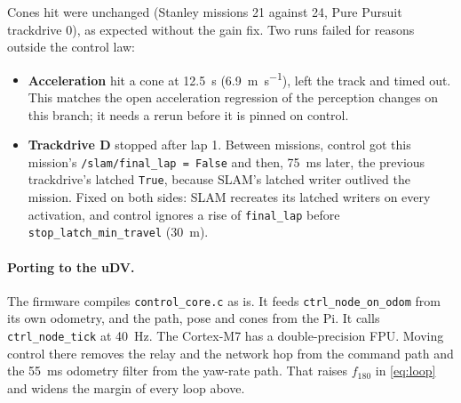 \documentclass[11pt,a4paper]{article}
\begin{document}
Cones hit were unchanged (Stanley missions 21 against 24, Pure Pursuit trackdrive 0), as
expected without the gain fix. Two runs failed for reasons outside the control law:
\begin{itemize}
\item \textbf{Acceleration} hit a cone at \SI{12.5}{\second} (\SI{6.9}{\metre\per\second}), left
the track and timed out. This matches the open acceleration regression of the
perception changes on this branch; it needs a rerun before it is pinned on control.
\item \textbf{Trackdrive D} stopped after lap 1. Between missions, control got this
mission's \texttt{/slam/final\_lap = False} and then, \SI{75}{\milli\second} later, the previous
trackdrive's latched \texttt{True}, because SLAM's latched writer outlived the mission.
Fixed on both sides: SLAM recreates its latched writers on every activation, and control
ignores a rise of \texttt{final\_lap} before \texttt{stop\_latch\_min\_travel} (\SI{30}{\metre}).
\end{itemize}

\paragraph{Porting to the uDV.} The firmware compiles \texttt{control\_core.c} as is. It
feeds \texttt{ctrl\_node\_on\_odom} from its own odometry, and the path, pose and cones
from the Pi. It calls \texttt{ctrl\_node\_tick} at \SI{40}{\hertz}. The Cortex-M7 has a
double-precision FPU. Moving control there removes the relay and the network hop from the
command path and the \SI{55}{\milli\second} odometry filter from the yaw-rate path. That
raises $f_{180}$ in \cref{eq:loop} and widens the margin of every loop above.
\end{document}
